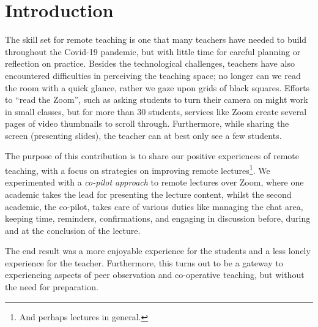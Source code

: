\documentclass[sigconf,natbib=false]{acmart}
\begin{document}

\keywords{}

\maketitle

\section{Introduction}

The skill set for remote teaching is one that many teachers have needed to  build throughout the Covid-19 pandemic, but with little time for careful planning or reflection on practice. Besides the technological challenges, teachers have also encountered difficulties in perceiving the teaching space; no longer can we read the room with a quick glance, rather we gaze upon grids of black squares. Efforts to \enquote{read the Zoom}, such as asking students to turn their camera on might work in small classes, but for more than 30 students, services like Zoom create several pages of video thumbnails to scroll through. Furthermore, while sharing the screen (\eg presenting slides), the teacher can at best only see a few students.

The purpose of this contribution is to share our positive experiences of remote teaching, with a focus on strategies on improving remote lectures\footnote{And perhaps lectures in general.}. We experimented with a \emph{co-pilot approach} to remote lectures over Zoom, where one academic takes the lead for presenting the lecture content, whilst the second academic, the co-pilot, takes care of various duties like managing the chat area, keeping time, reminders, confirmations, and engaging in discussion before, during and at the conclusion of the lecture.

The end result was a more enjoyable experience for the students and a less lonely experience for the teacher. Furthermore, this turns out to be a gateway to experiencing aspects of peer observation and co-operative teaching, but without the need for preparation.
\end{document}
